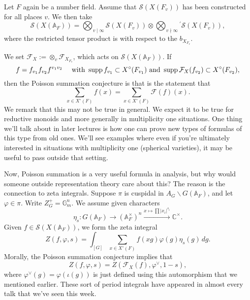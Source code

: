 \documentclass[reqno]{amsart} 
\numberwithin{theorem}{section}
\numberwithin{equation}{section}
\numberwithin{exercise}{section}
\begin{document}
Let $F$ again be a number field.  Assume that $\mathcal{S}(X(F_v))$ has been constructed for all places $v$.  We then take
\begin{equation*}
  \mathcal{S}(X(\mathbb{A}_F)) = \bigotimes_{v \mid \infty} \mathcal{S}(X(F_v))  \otimes \bigotimes_{v \nmid \infty} {}^{'} \mathcal{S}(X(F_v)),
\end{equation*}
where the restricted tensor product is with respect to the $b_{X_{F_v}}$.

We set $\mathcal{F}_X := \otimes_v \mathcal{F}_{X_{F_v}}$, which acts on $\mathcal{S}(X(\mathbb{A}_F))$.  If
\begin{equation}\label{eq:cq6txloduw}
  f = f_{v_1} f_{v_2} f^{v_1 v_2}
  \quad \text{ with }
  \operatorname{supp} f_{v_1}  \subset X^{\circ}(F_{v_1})
  \text{ and }
  \operatorname{supp} \mathcal{F}_X(f_{v_2}) \subset X^{\circ}(F_{v_2}),
\end{equation}
then the Poisson summation conjecture is that is the statement that
\begin{equation*}
  \sum_{x \in X^{\circ}(F)} f(x) = \sum_{x \in X^{\circ}(F)} \mathcal{F}(f)(x).
\end{equation*}
We remark that this may not be true in general.  We expect it to be true for reductive monoids and more generally in multiplicity one situations.  One thing we'll talk about in later lectures is how one can prove new types of formulas of this type from old ones.  We'll see examples where even if you're ultimately interested in situations with multiplicity one (spherical varieties), it may be useful to pass outside that setting.

Now, Poisson summation is a very useful formula in analysis, but why would someone outside representation theory care about this?  The reason is the connection to zeta integrals.  Suppose $\pi$ is cuspidal in $A_G \backslash G(\mathbb{A}_F)$, and let $\varphi \in \pi$.  Write $Z_G^+ = \mathbb{G}_m^n$.  We assume given characters
\begin{equation*}
  \eta_s : G(\mathbb{A}_F) \rightarrow(\mathbb{A}_F^\times)^n \xrightarrow{x \mapsto \prod \lvert x_i \rvert^{s_i}} \mathbb{C}^\times.
\end{equation*}
Given $f \in \mathcal{S}(X(\mathbb{A}_F))$, we form the zeta integral
\begin{equation*}
  Z(f, \varphi, s) = \int_{[G]}
  \sum_{x \in X^{\circ}(F)} f(x g)
  \varphi(g)
  \eta_s(g) \, d g.
\end{equation*}
Morally, the Poisson summation conjecture implies that
\begin{equation*}
  Z(f, \varphi, s) = Z(\mathcal{F}_X(f), \varphi^\vee, 1 - s),
\end{equation*}
where $\varphi^\vee(g) = \varphi(\iota(g))$ is just defined using this automorphism that we mentioned earlier.  These sort of period integrals have appeared in almost every talk that we've seen this week.
\end{document}
